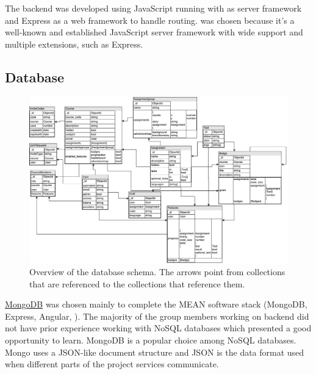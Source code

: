 
The backend was developed using JavaScript running with \nodejs{} as server framework and Express as a web framework to handle routing. \nodejs{} was chosen because it's a well-known and established JavaScript server framework with wide support and multiple extensions, such as Express. 

\subsection{Database} \label{database}


\begin{figure}
    \centering
    \includegraphics[width=\textwidth]{img/gpp_database-schema.pdf}
    \caption{Overview of the database schema. The arrows point from collections that are referenced to the collections that reference them.}
    \label{fig:schema}
\end{figure}
		
\href{https://www.mongodb.com}{MongoDB} was chosen mainly to complete the MEAN software stack (MongoDB, Express, Angular, \nodejs{}). The majority of the group members working on backend did not have prior experience working with NoSQL databases which presented a good opportunity to learn. MongoDB is a popular choice among NoSQL databases. Mongo uses a JSON-like document structure and JSON is the data format used when different parts of the project services communicate.

